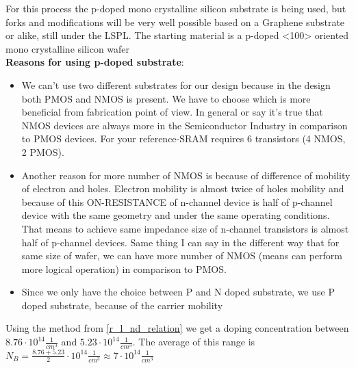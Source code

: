 For this process the p-doped mono crystalline silicon substrate is being used, but forks and modifications will be very well possible based on a Graphene substrate or alike, still under the LSPL.
The starting material is a p-doped <100> oriented mono crystalline silicon wafer\\

\textbf{Reasons for using p-doped substrate}:\begin{itemize}
\item We can't use two different substrates for our design because in the design both PMOS and NMOS is present.
We have to choose which is more beneficial from fabrication point of view.
In general or say it's true that NMOS devices are always more in the Semiconductor Industry in comparison to PMOS devices.
For your reference-SRAM requires 6 transistors (4 NMOS, 2 PMOS).
\item Another reason for more number of NMOS is because of difference of mobility of electron and holes.
Electron mobility is almost twice of holes mobility and because of this ON-RESISTANCE of n-channel device is half of p-channel device with the same geometry and under the same operating conditions.
That means to achieve same impedance size of n-channel transistors is almost half of p-channel devices.
Same thing I can say in the different way that for same size of wafer, we can have more number of NMOS (means can perform more logical operation) in comparison to PMOS.
\item Since we only have the choice between P and N doped substrate, we use P doped substrate, because of the carrier mobility
\end{itemize}

Using the method from \autoref{r_l_nd_relation} we get a doping concentration between $8.76 \cdot 10^{14} \frac{1}{cm^3}$ and $5.23 \cdot 10^{14} \frac{1}{cm^3}$.
The average of this range is $N_B = \frac{8.76+5.23 }{2} \cdot 10^{14} \frac{1}{cm^3} \approx 7 \cdot 10^{14} \frac{1}{cm^3}$